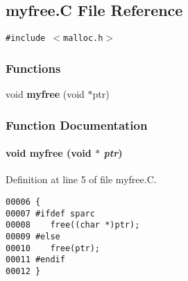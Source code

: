 \subsection{myfree.C File Reference}
\label{myfree.C}
{\tt \#include $<$malloc.h$>$}\par
\subsubsection*{Functions}
\begin{CompactItemize}
\item 
void {\bf myfree} (void $\ast$ptr)
\end{CompactItemize}


\subsubsection{Function Documentation}
\label{myfree.C_a0}
\paragraph{\setlength{\rightskip}{0pt plus 5cm}void myfree (void $\ast$ {\em ptr})}\hfill



Definition at line 5 of file myfree.C.\small\begin{verbatim}00006 {
00007 #ifdef sparc
00008    free((char *)ptr);
00009 #else
00010    free(ptr);
00011 #endif
00012 }
\end{verbatim}\normalsize 
